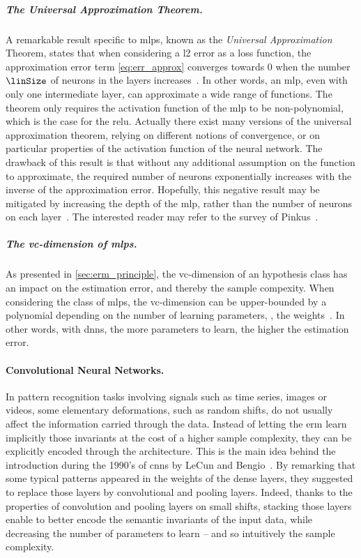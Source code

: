 \subparagraph{The Universal Approximation Theorem.}
\label{sec:universal_approx_thm}
A remarkable result specific to \glspl{mlp}, known as the \emph{Universal Approximation} Theorem, states that when considering a \gls{l2} error as a loss function, the approximation error term \eqref{eq:err_approx} converges towards \(0\) when the number \(\linSize\) of neurons in the layers increases~\cite{petrushev_approximation_1998}.
In other words, an \gls{mlp}, even with only one intermediate layer, can approximate a wide range of functions.
The theorem only requires the activation function of the \gls{mlp} to be non-polynomial, which is the case for the \gls{relu}.
Actually there exist many versions of the universal approximation theorem, relying on different notions of convergence, or on particular properties of the activation function of the neural network.
The drawback of this result is that without any additional assumption on the function to approximate, the required number of neurons exponentially increases with the inverse of the approximation error.
Hopefully, this negative result may be mitigated by increasing the depth of the \gls{mlp}, rather than the number of neurons on each layer~\cite{telegarsky_benefit_2016}.
The interested reader may refer to the survey of Pinkus~\cite{pinkus_approximation_1999}.

\subparagraph{The \gls{vc}-dimension of \glspl{mlp}.}
As presented in \autoref{sec:erm_principle}, the \gls{vc}-dimension of an hypothesis class has an impact on the estimation error, and thereby the sample compexity.
When considering the class of \glspl{mlp}, the \gls{vc}-dimension can be upper-bounded by a polynomial depending on the number of learning parameters, \ie{}, the weights~\cite[Sec.~20.4]{shalev-shwartz_understanding_2014}.
In other words, with \glspl{dnn}, the more parameters to learn, the higher the estimation error.

\paragraph{Convolutional Neural Networks.}
In pattern recognition tasks involving signals such as time series, images or videos, some elementary deformations, such as random shifts, do not usually affect the information carried through the data.
Instead of letting the \gls{erm} learn implicitly those invariants at the cost of a higher sample complexity, they can be explicitly encoded through the architecture.
This is the main idea behind the introduction during the 1990's of \glspl{cnn} by LeCun and Bengio~\cite{bengio_globally_1993,lecun_word_1994}.
By remarking that some typical patterns appeared in the weights of the dense layers, they suggested to replace those layers by convolutional and pooling layers.
Indeed, thanks to the properties of convolution and pooling layers on small shifts, stacking those layers enable to better encode the semantic invariants of the input data, while decreasing the number of parameters to learn -- and so intuitively the sample complexity.


